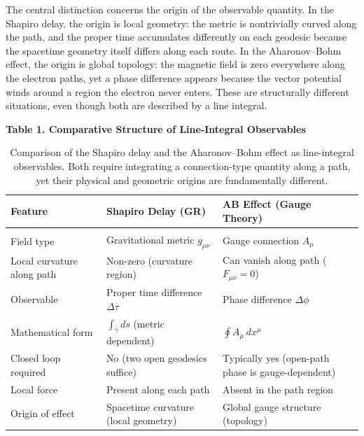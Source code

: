 \documentclass[12pt,letterpaper]{article}
\begin{document}
The central distinction concerns the origin of the observable quantity. In the Shapiro delay, the origin is local geometry: the metric is nontrivially curved along the path, and the proper time accumulates differently on each geodesic because the spacetime geometry itself differs along each route. In the Aharonov--Bohm effect, the origin is global topology: the magnetic field is zero everywhere along the electron paths, yet a phase difference appears because the vector potential winds around a region the electron never enters. These are structurally different situations, even though both are described by a line integral.

\begin{table}[h]
\centering
\textbf{Table 1. Comparative Structure of Line-Integral Observables}\\[6pt]
\begin{tabularx}{\textwidth}{lXX}
\toprule
\textbf{Feature} & \textbf{Shapiro Delay (GR)} & \textbf{AB Effect (Gauge Theory)} \\[6pt]
\midrule\\[-4pt]
Field type & Gravitational metric $g_{\mu\nu}$ & Gauge connection $A_\mu$ \\[8pt]
Local curvature along path & Non-zero (curvature region) & Can vanish along path ($F_{\mu\nu}=0$) \\[8pt]
Observable & Proper time difference $\Delta\tau$ & Phase difference $\Delta\phi$ \\[8pt]
Mathematical form & $\displaystyle\int_\gamma ds$ \quad (metric dependent) & $\displaystyle\oint A_\mu\,dx^\mu$ \\[12pt]
Closed loop required & No (two open geodesics suffice) & Typically yes (open-path phase is gauge-dependent) \\[8pt]
Local force & Present along each path & Absent in the path region \\[8pt]
Origin of effect & Spacetime curvature (local geometry) & Global gauge structure (topology) \\[4pt]
\bottomrule
\end{tabularx}
\caption{Comparison of the Shapiro delay and the Aharonov--Bohm effect as line-integral observables. Both require integrating a connection-type quantity along a path, yet their physical and geometric origins are fundamentally different.}
\label{tab:comparison}
\end{table}
\end{document}

